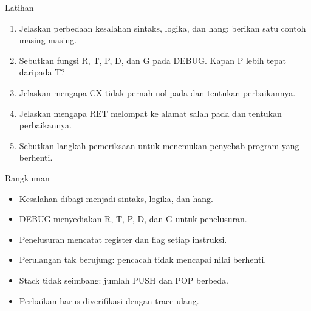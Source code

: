 \documentclass[aspectratio=169,11pt]{beamer}
\begin{document}
\begin{frame}{Latihan}
\small
\begin{enumerate}
    \item Jelaskan perbedaan kesalahan sintaks, logika, dan hang;
          berikan satu contoh masing-masing.

    \vspace{0.15em}
    \item Sebutkan fungsi R, T, P, D, dan G pada DEBUG. Kapan P lebih
          tepat daripada T?

    \vspace{0.15em}
    \item Jelaskan mengapa CX tidak pernah nol pada
           dan tentukan perbaikannya.

    \vspace{0.15em}
    \item Jelaskan mengapa RET melompat ke alamat salah pada
           dan tentukan perbaikannya.

    \vspace{0.15em}
    \item Sebutkan langkah pemeriksaan untuk menemukan penyebab
          program yang berhenti.
\end{enumerate}
\end{frame}

\begin{frame}{Rangkuman}
\small
\begin{itemize}
    \item Kesalahan dibagi menjadi sintaks, logika, dan hang.

    \vspace{0.15em}
    \item DEBUG menyediakan R, T, P, D, dan G untuk penelusuran.

    \vspace{0.15em}
    \item Penelusuran mencatat register dan flag setiap instruksi.

    \vspace{0.15em}
    \item Perulangan tak berujung: pencacah tidak mencapai nilai
          berhenti.

    \vspace{0.15em}
    \item Stack tidak seimbang: jumlah PUSH dan POP berbeda.

    \vspace{0.15em}
    \item Perbaikan harus diverifikasi dengan trace ulang.
\end{itemize}
\end{frame}
\end{document}
